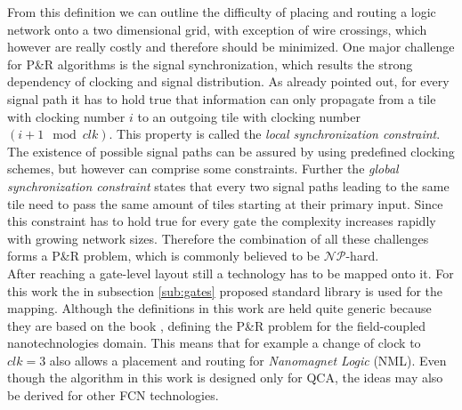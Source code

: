 From this definition we can outline the difficulty of placing and routing a logic network onto a two dimensional grid, with exception of wire crossings, which however are really costly and therefore should be minimized. One major challenge for P\&R algorithms is the signal synchronization, which results the strong dependency of clocking and signal distribution. As already pointed out, for every signal path it has to hold true that information can only propagate from a tile with clocking number $i$ to an outgoing tile with clocking number $(i+1 \mod clk)$. This property is called the \textit{local synchronization constraint}. The existence of possible signal paths can be assured by using predefined clocking schemes, but however can comprise some constraints. Further the \textit{global synchronization constraint} states that every two signal paths leading to the same tile need to pass the same amount of tiles starting at their primary input. Since this constraint has to hold true for every gate the complexity increases rapidly with growing network sizes. Therefore the combination of all these challenges forms a P\&R problem, which is commonly believed to be $\mathcal{NP}$-hard. \\
After reaching a gate-level layout still a technology has to be mapped onto it. For this work the in subsection \ref{sub:gates} proposed standard library is used for the mapping. Although the definitions in this work are held quite generic because they are based on the book \cite{Walter}, defining the P\&R problem for the field-coupled nanotechnologies domain. This means that for example a change of clock to $clk = 3$ also allows a placement and routing for \textit{Nanomagnet Logic} (NML). Even though the algorithm in this work is designed only for QCA, the ideas may also be derived for other FCN technologies.